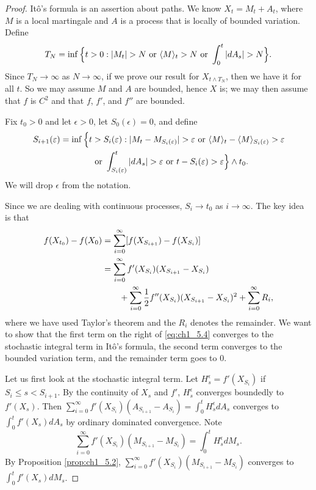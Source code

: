 \begin{proof}
It\^o's formula is an assertion about paths. We know $X_t = M_t + A_t$, where $M$ is a local martingale and $A$ is a process that is locally of bounded variation. Define
\[
    T_N = \inf\Big\{t > 0 : |M_t| > N~\text{or}~\langle M \rangle_t > N~\text{or}~\int_0^t |dA_s| > N\Big\}.
\]
Since $T_N \to \infty$ as $N \to \infty$, if we prove our result for $X_{t\wedge T_N}$, then we have it for all $t$. So we may assume $M$ and $A$ are bounded, hence $X$ is; we may then assume that $f$ is $C^2$ and that $f$, $f'$, and $f''$ are bounded.

Fix $t_0 > 0$ and let $\epsilon > 0$, let $S_0(\epsilon) = 0$, and define
\mpagebreak
\begin{gather*}
    S_{i+1}(\varepsilon) = \inf\Big\{t > S_i(\varepsilon) : |M_t - M_{S_i(\varepsilon)}| > \varepsilon~\text{or}~\langle M \rangle_t - \langle M \rangle_{S_i(\varepsilon)} > \varepsilon \\
    \qquad\quad\text{or}~\int_{S_i(\varepsilon)}^t |dA_s| > \varepsilon~\text{or}~t - S_i(\varepsilon) > \varepsilon\Big\} \wedge t_0.
\end{gather*}
We will drop $\epsilon$ from the notation.

Since we are dealing with continuous processes, $S_i \to t_0$ as $i \to \infty$. The key idea is that
\begin{align}\label{eq:ch1_5.4}
    f(X_{t_0}) - f(X_0) &= \sum_{i=0}^{\infty} [f(X_{S_{i+1}}) - f(X_{S_i})] \\
    &= \sum_{i=0}^{\infty} f'(X_{S_i})(X_{S_{i+1}} - X_{S_i}) \notag \\
    &\qquad + \sum_{i=0}^{\infty} \frac{1}{2}f''(X_{S_i})(X_{S_{i+1}} - X_{S_i})^2 + \sum_{i=0}^{\infty} R_i, \notag
\end{align}
where we have used Taylor's theorem and the $R_i$ denotes the remainder. We want to show that the first term on the right of \eqref{eq:ch1_5.4} converges to the stochastic integral term in It\^o's formula, the second term converges to the bounded variation term, and the remainder term goes to $0$.

Let us first look at the stochastic integral term. Let $H_s^\epsilon = f'(X_{S_i})$ if $S_i \leq s < S_{i+1}$. By the continuity of $X_s$ and $f'$, $H_s^\epsilon$ converges boundedly to $f'(X_s)$. Then $\sum_{i=0}^\infty f'(X_{S_i})(A_{S_{i+1}} - A_{S_i}) = \int_0^t H_s^\epsilon dA_s$ converges to $\int_0^t f'(X_s)dA_s$ by ordinary dominated convergence. Note
\[
    \sum_{i=0}^\infty f'(X_{S_i})(M_{S_{i+1}} - M_{S_i})=\int_0^t H_s^\epsilon dM_s.
\]
By Proposition \ref{prop:ch1_5.2}, $\sum_{i=0}^\infty f'(X_{S_i})(M_{S_{i+1}} - M_{S_i})$ converges to $\int_0^t f'(X_s)dM_s$.


\end{proof}
